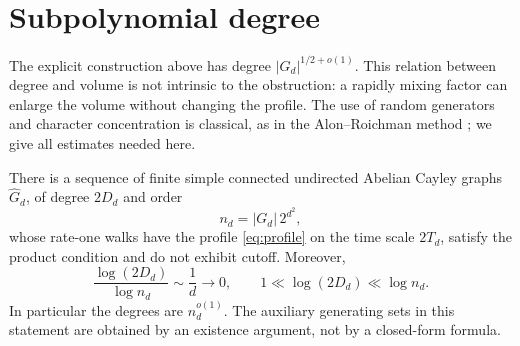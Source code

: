 \section{Subpolynomial degree}
The explicit construction above has degree $|G_d|^{1/2+o(1)}$. This relation between degree and volume is not intrinsic to the obstruction: a rapidly mixing factor can enlarge the volume without changing the profile. The use of random generators and character concentration is classical, as in the Alon--Roichman method \cite{AR}; we give all estimates needed here.

\begin{corollary}\label{cor:padding}
There is a sequence of finite simple connected undirected Abelian Cayley graphs $\widehat G_d$, of degree $2D_d$ and order
\[
 n_d=|G_d|\,2^{d^2},
\]
whose rate-one walks have the profile \eqref{eq:profile} on the time scale $2T_d$, satisfy the product condition and do not exhibit cutoff. Moreover,
\[
 \frac{\log(2D_d)}{\log n_d}\sim\frac1d\longrightarrow0,
 \qquad 1\ll\log(2D_d)\ll\log n_d.
\]
In particular the degrees are $n_d^{o(1)}$. The auxiliary generating sets in this statement are obtained by an existence argument, not by a closed-form formula.
\end{corollary}
